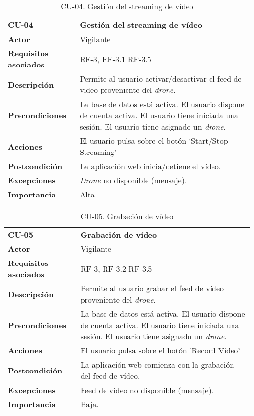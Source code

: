 \begin{table}[H]
	\begin{center}
		\begin{tabular}{m{3cm}  m{10cm}}\hline
			\toprule
			\textbf{CU-04} & \textbf{Gestión del streaming de vídeo}\\
			\otoprule
			\textbf{Actor} & Vigilante\\
			\textbf{Requisitos asociados} & RF-3, RF-3.1 RF-3.5\\
			\textbf{Descripción} & Permite al usuario activar/desactivar el feed de vídeo proveniente del \emph{drone}.\\
			\textbf{Precondiciones} & La base de datos está activa. El usuario dispone de cuenta activa. El usuario tiene iniciada una sesión. El usuario tiene asignado un \emph{drone}.\\
			\textbf{Acciones} & \item El usuario pulsa sobre el botón `Start/Stop Streaming'\\
			
			\textbf{Postcondición} & La aplicación web inicia/detiene el vídeo.\\
			\textbf{Excepciones} &  \emph{Drone} no disponible (mensaje).\\
			\textbf{Importancia} & Alta.\\
			\hline
			\bottomrule
		\end{tabular}
		\caption{CU-04. Gestión del streaming de vídeo}
		\label{tb:CU04}
	\end{center}
\end{table}


\begin{table}[H]
	\begin{center}
		\begin{tabular}{m{3cm}  m{10cm}}\hline
			\toprule
			\textbf{CU-05} & \textbf{Grabación de vídeo}\\
			\otoprule
			\textbf{Actor} & Vigilante\\
			\textbf{Requisitos asociados} & RF-3, RF-3.2 RF-3.5\\
			\textbf{Descripción} & Permite al usuario grabar el feed de vídeo proveniente del \emph{drone}.\\
			\textbf{Precondiciones} & La base de datos está activa. El usuario dispone de cuenta activa. El usuario tiene iniciada una sesión. El usuario tiene asignado un \emph{drone}.\\
			\textbf{Acciones} & \item El usuario pulsa sobre el botón `Record Video'\\
			
			\textbf{Postcondición} & La aplicación web comienza con la grabación del feed de vídeo.\\
			\textbf{Excepciones} &\item Feed de vídeo no disponible (mensaje).\\
			\textbf{Importancia} & Baja.\\
			\hline
			\bottomrule
		\end{tabular}
		\caption{CU-05. Grabación de vídeo}
		\label{tb:CU05}
	\end{center}
\end{table}


